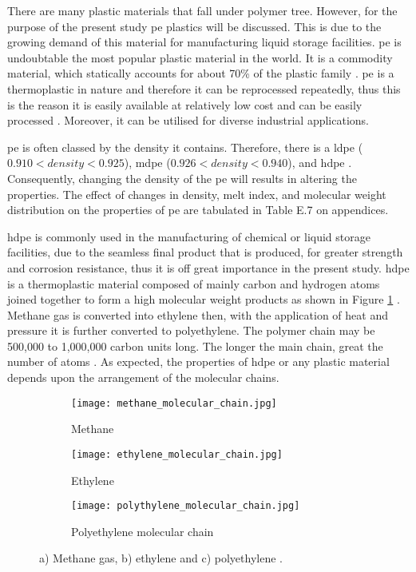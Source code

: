There are many plastic materials that fall under polymer tree. However, for the purpose of the present study \acrfull{pe} plastics will be discussed. This is due to the growing demand of this material for manufacturing liquid storage facilities. \acrshort{pe} is undoubtable the most popular plastic material in the world. It is a commodity material, which statically accounts for about 70\% of the plastic family \cite{roslan2013effect}.  \acrshort{pe} is a thermoplastic in nature and therefore it can be reprocessed repeatedly, thus this is the reason it is easily available at relatively low cost and can be easily processed \cite{kurtz2009cross}. Moreover, it can be utilised for diverse industrial applications. 

\acrshort{pe} is often classed by the density it contains. Therefore, there is a \Acrfull{ldpe} ($0.910 < density < 0.925$), \Acrfull{mdpe} ($0.926 < density < 0.940$), and \Acrfull{hdpe} \cite{gabriel1998history}. Consequently, changing the density of the \acrshort{pe} will results in altering the properties. The effect of changes in density, melt index, and molecular weight distribution on the properties of \acrshort{pe} are tabulated in Table E.7 on appendices. 

\acrshort{hdpe} is commonly used in the manufacturing of chemical or liquid storage facilities, due to the seamless final product that is produced, for greater strength and corrosion resistance, thus it is off great importance in the present study. \acrshort{hdpe} is a thermoplastic material composed of mainly carbon and hydrogen atoms joined together to form a high molecular weight products as shown in Figure \ref{ch3:figure:molecular_chains} \cite{gabriel1998history}. Methane gas is converted into ethylene then, with the application of heat and pressure it is further converted to polyethylene. The polymer chain may be 500,000 to 1,000,000 carbon units long. The longer the main chain, great the number of atoms \cite{gabriel1998history}. As expected, the properties of \acrshort{hdpe} or any plastic material depends upon the arrangement of the molecular chains. 
               
\begin{figure}[H]
\centering

\begin{subfigure}{.3\textwidth}
    \centering
    \texttt{[image: methane\_molecular\_chain.jpg]}
    \caption{Methane}
\end{subfigure}
\begin{subfigure}{.3\textwidth}
    \centering
    \texttt{[image: ethylene\_molecular\_chain.jpg]}
    \caption{Ethylene}
\end{subfigure}
\begin{subfigure}{.65\textwidth}
    \vspace{1.5em}
    \centering
    \texttt{[image: polythylene\_molecular\_chain.jpg]}
    \caption{Polyethylene molecular chain}
\end{subfigure}

\caption{a) Methane gas, b) ethylene and c) polyethylene \cite{gabriel1998history}.}
\label{ch3:figure:molecular_chains}
\end{figure}

